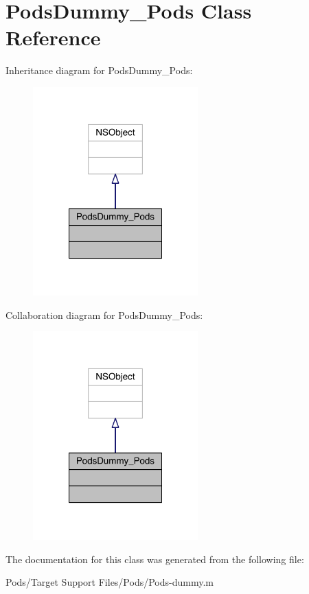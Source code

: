 \hypertarget{interface_pods_dummy___pods}{\section{Pods\-Dummy\-\_\-\-Pods Class Reference}
\label{interface_pods_dummy___pods}
}


Inheritance diagram for Pods\-Dummy\-\_\-\-Pods\-:\nopagebreak
\begin{figure}[H]
\begin{center}
\leavevmode
\includegraphics[width=180pt]{interface_pods_dummy___pods__inherit__graph}
\end{center}
\end{figure}


Collaboration diagram for Pods\-Dummy\-\_\-\-Pods\-:\nopagebreak
\begin{figure}[H]
\begin{center}
\leavevmode
\includegraphics[width=180pt]{interface_pods_dummy___pods__coll__graph}
\end{center}
\end{figure}


The documentation for this class was generated from the following file\-:\begin{DoxyCompactItemize}
\item 
Pods/\-Target Support Files/\-Pods/Pods-\/dummy.\-m\end{DoxyCompactItemize}
